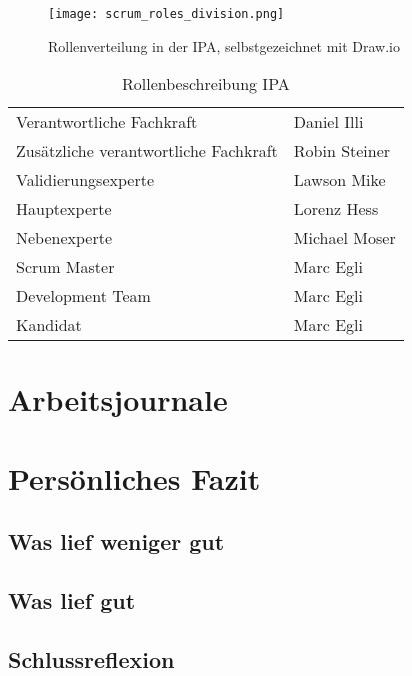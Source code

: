 \begin{figure}[h]
    \centering
    \texttt{[image: scrum\_roles\_division.png]}
    \caption{Rollenverteilung in der IPA, selbstgezeichnet mit Draw.io}
\end{figure}

\begin{table}[h!]
    \begin{tabular}{|L{0.4\textwidth}|L{0.5\textwidth}|}
        \hline
          \\[12pt]
        \hline
        Verantwortliche Fachkraft & Daniel Illi  \\
        \hline
        Zusätzliche verantwortliche Fachkraft & Robin Steiner \\
        \hline
        Validierungsexperte & Lawson Mike \\ 
        \hline
        Hauptexperte & Lorenz Hess \\ 
        \hline
        Nebenexperte & Michael Moser \\ 
        \hline
        Scrum Master & Marc Egli \\ 
        \hline
        Development Team & Marc Egli \\ 
        \hline
        Kandidat & Marc Egli \\ 
        \hline
      \end{tabular}
      \caption{Rollenbeschreibung IPA}
\end{table}



\chapter{Arbeitsjournale}













\chapter{Persönliches Fazit}

\section{Was lief weniger gut}

\section{Was lief gut}

\section{Schlussreflexion}
